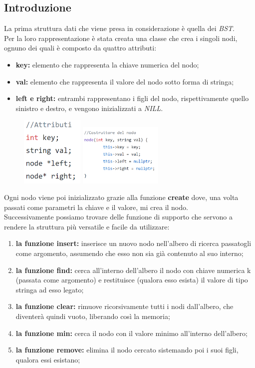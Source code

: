\documentclass[a4paper]{article}
\begin{document}
			\subsection{Introduzione}
				La prima struttura dati che viene presa in considerazione è quella dei \textit{BST}. \\
				Per la loro rappresentazione è stata creata una classe che crea i singoli nodi, ognuno dei quali è composto da quattro attributi:
				\begin{itemize}
					\item \textbf{key:} elemento che rappresenta la chiave numerica del nodo;
					\item \textbf{val:} elemento che rappresenta il valore del nodo sotto forma di stringa;
					\item \textbf{left e right:} entrambi rappresentano i figli del nodo, rispettivamente quello sinistro e destro, e vengono inizializzati a \textit{NILL}.
				\end{itemize}
			    \begin{figure}[ht]
			    	\includegraphics[width=3cm]{Attributi}
			    	\includegraphics[width=4cm]{Creatore1}
			    \end{figure}
		    	Ogni nodo viene poi inizializzato grazie alla funzione \textbf{create} dove, una volta passati come parametri la chiave e il valore, mi crea il nodo. \\
		    	Successivamente possiamo trovare delle funzione di supporto che servono a rendere la struttura più versatile e facile da utilizzare:
		    	\begin{enumerate}
		    		\item \textbf{la funzione insert:} inserisce un nuovo nodo nell'albero di ricerca passatogli come argomento, assumendo che esso non sia già contenuto al suo interno;
		    		\item \textbf{la funzione find:} cerca all'interno dell'albero il nodo con chiave numerica k (passata come argomento) e restituisce (qualora esso esista) il valore di tipo stringa ad esso legato;
		    		\item \textbf{la funzione clear:} rimuove ricorsivamente tutti i nodi dall'albero, che diventerà quindi vuoto, liberando così la memoria;
		    		\item \textbf{la funzione min:} cerca il nodo con il valore minimo all'interno dell'albero;
		    		\item \textbf{la funzione remove:} elimina il nodo cercato sistemando poi i suoi figli, qualora essi esistano;
		    	\end{enumerate}
\end{document}
